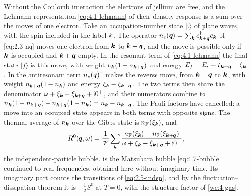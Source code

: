 Without the Coulomb interaction the electrons of jellium are free, and the Lehmann representation \cref{eq:4.1-lehmann} of their density response is a sum over the moves of one electron. Take an occupation-number state $|i\rangle$ of plane waves, with the spin included in the label $\bm{k}$. The operator $n_e(\bm{q}) = \sum_{\bm{k}}c^\dagger_{\bm{k}+\bm{q}}c_{\bm{k}}$ of \cref{eq:2.3-nq} moves one electron from $\bm{k}$ to $\bm{k} + \bm{q}$, and the move is possible only if $\bm{k}$ is occupied and $\bm{k} + \bm{q}$ empty. In the resonant term of \cref{eq:4.1-lehmann} the final state $|f\rangle$ is this move, with weight $n_{\bm{k}}(1 - n_{\bm{k}+\bm{q}})$ and energy $E_f - E_i = \xi_{\bm{k}+\bm{q}} - \xi_{\bm{k}}$. In the antiresonant term $n_e(\bm{q})^\dagger$ makes the reverse move, from $\bm{k} + \bm{q}$ to $\bm{k}$, with weight $n_{\bm{k}+\bm{q}}(1 - n_{\bm{k}})$ and energy $\xi_{\bm{k}} - \xi_{\bm{k}+\bm{q}}$. The two terms then share the denominator $\omega + \xi_{\bm{k}} - \xi_{\bm{k}+\bm{q}} + \mathrm{i}0^+$, and their numerators combine to $n_{\bm{k}}(1 - n_{\bm{k}+\bm{q}}) - n_{\bm{k}+\bm{q}}(1 - n_{\bm{k}}) = n_{\bm{k}} - n_{\bm{k}+\bm{q}}$. The Pauli factors have cancelled: a move into an occupied state appears in both terms with opposite signs. The thermal average of $n_{\bm{k}}$ over the Gibbs state is $n_{\mathrm{F}}(\xi_{\bm{k}})$, and
\begin{equation}
  R^0(\bm{q},\omega) = \frac{1}{\mathscr{V}}\sum_{\bm{k}}\frac{n_{\mathrm{F}}(\xi_{\bm{k}}) - n_{\mathrm{F}}(\xi_{\bm{k}+\bm{q}})}{\omega + \xi_{\bm{k}} - \xi_{\bm{k}+\bm{q}} + \mathrm{i}0^+} ,
  \label{eq:4.5-R0}
\end{equation}
the independent-particle bubble.  is the Matsubara bubble \cref{eq:4.7-bubble} continued to real frequencies, obtained here without imaginary time. Its imaginary part counts the transitions of \cref{eq:2.5-indep}, and by the fluctuation--dissipation theorem it is $-\tfrac12S^0$ at $T = 0$, with the structure factor of \cref{we:4-gas}.

